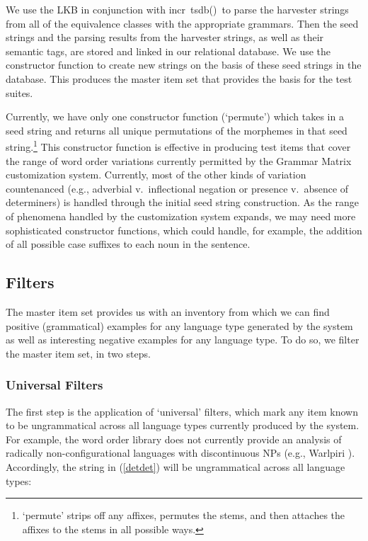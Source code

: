 \documentclass[11pt]{article}
\newcommand{\itsdb}{\mbox{\sf \lbrack incr tsdb()\rbrack}}
\begin{document}
We use the LKB in conjunction with \itsdb\ to parse the harvester strings from all of
the equivalence classes with the appropriate grammars.  Then the seed strings and the parsing results from the harvester strings, as well as their semantic tags, are stored and linked in our relational database.  We use the constructor function to create new strings on the basis of these seed strings in the
database.  This produces the master item set that provides the basis for the test suites.

Currently, we have only one constructor function (`permute') which
takes in a seed string and returns all unique permutations of the
morphemes in that seed string.\footnote{`permute' strips off any
affixes, permutes the stems, and then attaches the affixes to the
stems in all possible ways.}  This constructor function is effective
in producing test items that cover the range of word order variations
currently permitted by the Grammar Matrix customization system.  
Currently, most of the other kinds of variation countenanced (e.g.,
adverbial v.\ inflectional negation or presence v.\ absence of determiners) 
is handled through the initial seed string construction.  As the range of
phenomena handled by the customization system expands, we may need
more sophisticated constructor functions, which could handle, for
example, the addition of all possible case suffixes to each noun
in the sentence.

\subsection{Filters}

The master item set provides us with an inventory from which we
can find positive (grammatical) examples for any language type
generated by the system as well as interesting negative examples for
any language type.  To do so, we filter the master item set, in two
steps.  


\subsubsection{Universal Filters}

The first step is the application of `universal' filters, which mark any
item known to be ungrammatical across all language types currently
produced by the system.  For example, the word order library does
not currently provide an analysis of radically non-configurational
languages with discontinuous NPs (e.g., Warlpiri \cite{Hale81}).
Accordingly, the string in (\ref{detdet}) will be ungrammatical
across all language types:
\end{document}
